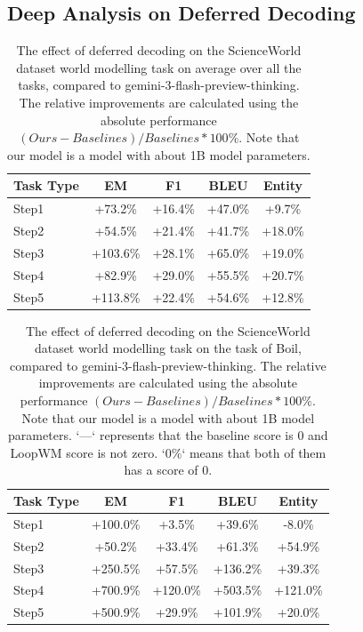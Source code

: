 \subsection{Deep Analysis on Deferred Decoding}

\begin{table}[h]
\centering
    \setlength\tabcolsep{15pt}
    \setlength\extrarowheight{0pt}
\caption{The effect of deferred decoding on the ScienceWorld dataset \citep{wang-etal-2022-scienceworld} world modelling task on average over all the tasks, compared to gemini-3-flash-preview-thinking. The relative improvements are calculated using the absolute performance $(Ours - Baselines) / Baselines * 100\%$. Note that our model is a model with about 1B model parameters.}
\label{tab:scienceworld1}
\begin{tabular}{lcccc}
\toprule
\textbf{Task Type} & \textbf{EM} & \textbf{F1}
  & \textbf{BLEU} & \textbf{Entity}\\
\midrule
Step1 & +73.2\% & +16.4\% & +47.0\% & +9.7\% \\
Step2 & +54.5\% & +21.4\% & +41.7\% & +18.0\% \\
Step3 & +103.6\% & +28.1\% & +65.0\% & +19.0\% \\
Step4 & +82.9\% & +29.0\% & +55.5\% & +20.7\% \\
Step5 & +113.8\% & +22.4\% & +54.6\% & +12.8\% \\
\bottomrule
\end{tabular}
\end{table}

\begin{table}[h]
\centering
    \setlength\tabcolsep{15pt}
    \setlength\extrarowheight{0pt}
\caption{The effect of deferred decoding on the ScienceWorld dataset \citep{wang-etal-2022-scienceworld} world modelling task on the task of Boil, compared to gemini-3-flash-preview-thinking. The relative improvements are calculated using the absolute performance $(Ours - Baselines) / Baselines * 100\%$. Note that our model is a model with about 1B model parameters. `—` represents that the baseline score is 0 and LoopWM score is not zero. `0\%` means that both of them has a score of 0.}
\label{tab:scienceworld2}
\begin{tabular}{lcccc}
\toprule
\textbf{Task Type} & \textbf{EM} & \textbf{F1}
  & \textbf{BLEU} & \textbf{Entity}\\
\midrule
Step1 & +100.0\% & +3.5\% & +39.6\% & -8.0\% \\
Step2 & +50.2\% & +33.4\% & +61.3\% & +54.9\% \\
Step3 & +250.5\% & +57.5\% & +136.2\% & +39.3\% \\
Step4 & +700.9\% & +120.0\% & +503.5\% & +121.0\% \\
Step5 & +500.9\% & +29.9\% & +101.9\% & +20.0\% \\
\bottomrule
\end{tabular}
\end{table}


